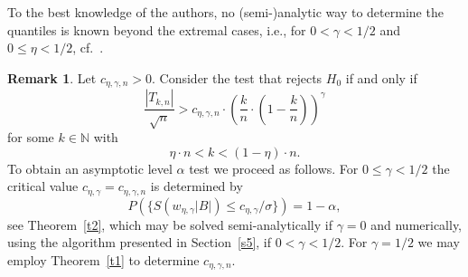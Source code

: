 \documentclass[a4paper]{amsart}
\theoremstyle{definition}
\newtheorem{rem}[exmp]{Remark}
\theoremstyle{plain}
\newcommand{\N}{\mathbb N}
\begin{document}
To the best knowledge of the authors, no (semi-)analytic way to
determine the quantiles is known beyond the extremal cases, i.e.,
for $0 < \gamma < 1/2$ and $0 \leq \eta < 1/2$,
cf.\ \citet*[p.~76]{salminen_yor_2011}.

\begin{rem}\label{r2}
Let $c_{\eta,\gamma,n}>0$.
Consider the test that rejects $H_0$ if and only
if
\[
\frac{|T_{k,n}|}{\sqrt{n}} > c_{\eta,\gamma,n} \cdot
\left(\frac{k}{n} \cdot \left(1-\frac{k}{n}\right)\right)^{\gamma}
\]
for some $k \in \N$ with
\[
\eta \cdot n < k < (1-\eta) \cdot n.
\]
To obtain an asymptotic level $\alpha$ test we proceed as follows.
For $0 \leq \gamma < 1/2$ the critical value
$c_{\eta,\gamma} = c_{\eta,\gamma,n}$ is determined by
\[
P(\{S(w_{\eta,\gamma}|B|) \leq c_{\eta,\gamma}/\sigma \}) = 1 - \alpha,
\]
see Theorem~\ref{t2}, which may be solved semi-analytically if
$\gamma = 0$ and numerically, using the algorithm presented in
Section~\ref{s5},
if $0 < \gamma < 1/2$. For $\gamma=1/2$ we may employ
Theorem~\ref{t1} to determine $c_{\eta,\gamma,n}$.
\end{rem}
\end{document}

